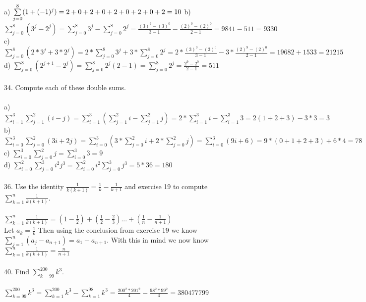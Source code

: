 \documentclass[11pt, oneside]{article}   	%
\begin{document}
a) $\sum\limits_{j=0}^8 (1 + (-1)^j) = 2 + 0 + 2 + 0 + 2 + 0 + 2 + 0 + 2 = 10\\$
b) $\sum\limits_{j=0}^8 (3^j - 2^j) = \sum\limits_{j=0}^8 3^j - \sum\limits_{j=0}^8 2^j = \frac{(3)^9 - (3)^0}{3 - 1} - \frac{(2)^9 - (2)^0}{2 - 1} = 9841 - 511 = 9330$\\
c) $\sum\limits_{j=0}^8 (2 * 3^j + 3 * 2^j) = 2*\sum\limits_{j=0}^8 3^j + 3*\sum\limits_{j=0}^8 2^j = 2*\frac{(3)^9 - (3)^0}{3 - 1} - 3*\frac{(2)^9 - (2)^0}{2 - 1} = 19682 + 1533 = 21215$\\
d) $\sum\limits_{j=0}^8 (2^{j + 1} - 2^j) = \sum\limits_{j=0}^8 2^j(2 - 1) = \sum\limits_{j=0}^8 2^j = \frac{2^9 - 2^0}{2 - 1} = 511$\\\\
34. Compute each of these double sums.\\\\
a) $\sum\limits_{i=1}^3 \sum\limits_{j=1}^2 (i - j) = \sum\limits_{i=1}^3 (\sum\limits_{j=1}^2 i - \sum\limits_{j=1}^2 j) = 2*\sum\limits_{i=1}^3 i - \sum\limits_{i=1}^3 3 = 2(1 + 2 + 3) - 3 * 3 = 3$\\
b) $\sum\limits_{i=0}^3 \sum\limits_{j=0}^2 (3i + 2j) = \sum\limits_{i=0}^3 (3*\sum\limits_{j=0}^2 i + 2*\sum\limits_{j=0}^2 j) = \sum\limits_{i=0}^3 (9i + 6) = 9*(0 + 1 + 2 + 3) + 6 * 4 = 78$\\
c) $\sum\limits_{i=0}^3 \sum\limits_{j=0}^2 j = \sum\limits_{i=0}^3 3 = 9$\\
d) $\sum\limits_{i=0}^2 \sum\limits_{j=0}^3 i^2j^3 = \sum\limits_{i=0}^2 i^2 \sum\limits_{j=0}^3 j^3 = 5 * 36 = 180$\\\\
36. Use the identity $\frac{1}{k(k + 1) }= \frac{1}{k} - \frac{1}{k + 1}$ and exercise 19 to compute $\sum\limits_{k=1}^n \frac{1}{k(k + 1)}$.\\\\
$\sum\limits_{k=1}^n \frac{1}{k(k + 1)} = (1 - \frac{1}{2}) + (\frac{1}{2} - \frac{2}{3})... + (\frac{1}{n} - \frac{1}{n + 1})$\\
Let $a_k = \frac{1}{k}$
Then using the conclusion from exercise 19 we know $\sum\limits_{j=1}^n (a_j - a_{n+1}) = a_1 - a_{n+1}$.
With this in mind we now know $\sum\limits_{k=1}^n \frac{1}{k(k + 1)} = \frac{n}{n + 1}$\\\\
40. Find $\sum\limits_{k=99}^200 k^3$.\\\\
$\sum\limits_{k=99}^{200} k^3 = \sum\limits_{k=1}^{200} k^3 - \sum\limits_{k=1}^{98} k^3 = \frac{200^2 * 201^2}{4} - \frac{98^2 * 99^2}{4} = 380477799$\\
\end{document}
